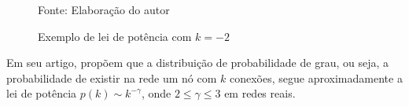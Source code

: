 \documentclass[12pt,a4paper]{article}
\theoremstyle{hypo}
\newcommand{\source}[1]{\vspace{-10pt} \caption*{Fonte: {#1}} }
\begin{document}
\begin{figure}[ht]
    \centering
    \caption{Exemplo de lei de potência com $k = -2$}
    \label{fig:exemplo-lei-potencia}
    \source{Elaboração do autor}
\end{figure}

Em seu artigo,  propõem que a distribuição de probabilidade de grau, ou seja, a probabilidade de existir na rede um nó com $k$ conexões, segue aproximadamente a lei de potência $p(k) \sim k^{-\gamma} $, onde $2 \le \gamma \le 3$ em redes reais.
\end{document}
